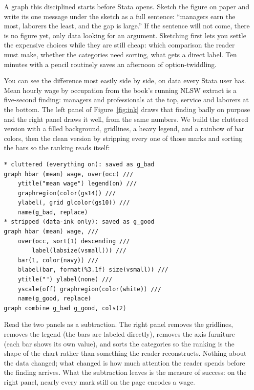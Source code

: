 \documentclass[
    a4paper,
    fontsize=10pt,
    twoside=true,
    numbers=noenddot,
]{kaobook}
\begin{document}
A graph this disciplined starts before Stata opens. Sketch the figure on paper and write its one message under the sketch as a full sentence: \enquote{managers earn the most, laborers the least, and the gap is large.} If the sentence will not come, there is no figure yet, only data looking for an argument. Sketching first lets you settle the expensive choices while they are still cheap: which comparison the reader must make, whether the categories need sorting, what gets a direct label. Ten minutes with a pencil routinely saves an afternoon of option-twiddling.

You can see the difference most easily side by side, on data every Stata user has. Mean hourly wage by occupation from the book's running NLSW extract is a five-second finding: managers and professionals at the top, service and laborers at the bottom. The left panel of Figure~\ref{fig:ink} draws that finding badly on purpose and the right panel draws it well, from the same numbers. We build the cluttered version with a filled background, gridlines, a heavy legend, and a rainbow of bar colors, then the clean version by stripping every one of those marks and sorting the bars so the ranking reads itself:
\par
{\footnotesize
\begin{verbatim}
* cluttered (everything on): saved as g_bad
graph hbar (mean) wage, over(occ) ///
    ytitle("mean wage") legend(on) ///
    graphregion(color(gs14)) ///
    ylabel(, grid glcolor(gs10)) ///
    name(g_bad, replace)
* stripped (data-ink only): saved as g_good
graph hbar (mean) wage, ///
    over(occ, sort(1) descending ///
        label(labsize(vsmall))) ///
    bar(1, color(navy)) ///
    blabel(bar, format(%3.1f) size(vsmall)) ///
    ytitle("") ylabel(none) ///
    yscale(off) graphregion(color(white)) ///
    name(g_good, replace)
graph combine g_bad g_good, cols(2)
\end{verbatim}
}
Read the two panels as a subtraction. The right panel removes the gridlines, removes the legend (the bars are labeled directly), removes the axis furniture (each bar shows its own value), and sorts the categories so the ranking is the shape of the chart rather than something the reader reconstructs. Nothing about the data changed; what changed is how much attention the reader spends before the finding arrives. What the subtraction leaves is the measure of success: on the right panel, nearly every mark still on the page encodes a wage.
\end{document}
